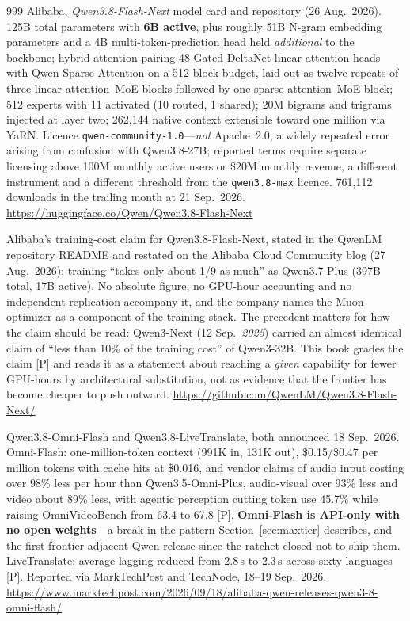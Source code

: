 \begin{thebibliography}{999}
 Alibaba, \emph{Qwen3.8-Flash-Next} model card and repository (26 Aug.\ 2026). 125B total parameters with \textbf{6B active}, plus roughly 51B N-gram embedding parameters and a 4B multi-token-prediction head held \emph{additional} to the backbone; hybrid attention pairing 48 Gated DeltaNet linear-attention heads with Qwen Sparse Attention on a 512-block budget, laid out as twelve repeats of three linear-attention--MoE blocks followed by one sparse-attention--MoE block; 512 experts with 11 activated (10 routed, 1 shared); 20M bigrams and trigrams injected at layer two; 262,144 native context extensible toward one million via YaRN. Licence \texttt{qwen-community-1.0}---\emph{not} Apache~2.0, a widely repeated error arising from confusion with Qwen3.8-27B; reported terms require separate licensing above 100M monthly active users or \$20M monthly revenue, a different instrument and a different threshold from the \texttt{qwen3.8-max} licence. 761,112 downloads in the trailing month at 21 Sep.\ 2026. \url{https://huggingface.co/Qwen/Qwen3.8-Flash-Next}

 Alibaba's training-cost claim for Qwen3.8-Flash-Next, stated in the QwenLM repository README and restated on the Alibaba Cloud Community blog (27 Aug.\ 2026): training ``takes only about 1/9 as much'' as Qwen3.7-Plus (397B total, 17B active). No absolute figure, no GPU-hour accounting and no independent replication accompany it, and the company names the Muon optimizer as a component of the training stack. The precedent matters for how the claim should be read: Qwen3-Next (12 Sep.\ \emph{2025}) carried an almost identical claim of ``less than 10\% of the training cost'' of Qwen3-32B. This book grades the claim [P] and reads it as a statement about reaching a \emph{given} capability for fewer GPU-hours by architectural substitution, not as evidence that the frontier has become cheaper to push outward. \url{https://github.com/QwenLM/Qwen3.8-Flash-Next/}

 Qwen3.8-Omni-Flash and Qwen3.8-LiveTranslate, both announced 18 Sep.\ 2026. Omni-Flash: one-million-token context (991K in, 131K out), \$0.15/\$0.47 per million tokens with cache hits at \$0.016, and vendor claims of audio input costing over 98\% less per hour than Qwen3.5-Omni-Plus, audio-visual over 93\% less and video about 89\% less, with agentic perception cutting token use 45.7\% while raising OmniVideoBench from 63.4 to 67.8 [P]. \textbf{Omni-Flash is API-only with no open weights}---a break in the pattern Section~\ref{sec:maxtier} describes, and the first frontier-adjacent Qwen release since the ratchet closed not to ship them. LiveTranslate: average lagging reduced from 2.8\,s to 2.3\,s across sixty languages [P]. Reported via MarkTechPost and TechNode, 18--19 Sep.\ 2026. \url{https://www.marktechpost.com/2026/09/18/alibaba-qwen-releases-qwen3-8-omni-flash/}


\end{thebibliography}
